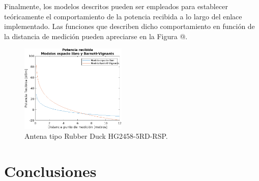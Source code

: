 \documentclass[conference]{IEEEtran}
\begin{document}
Finalmente, los modelos descritos pueden ser empleados para establecer teóricamente el comportamiento de la potencia 
recibida a lo largo del enlace implementado. Las funciones que describen dicho comportamiento en función de la distancia 
de medición pueden apreciarse en la Figura @. 
\begin{figure}
    \centering
          \includegraphics[width=0.45\textwidth]{Potencia_Modelos.png}
        \caption{Antena tipo Rubber Duck HG2458-5RD-RSP.
        }
        \label{fig:Potencia_Modelos}
\end{figure}
\section{Conclusiones}
\end{document}
